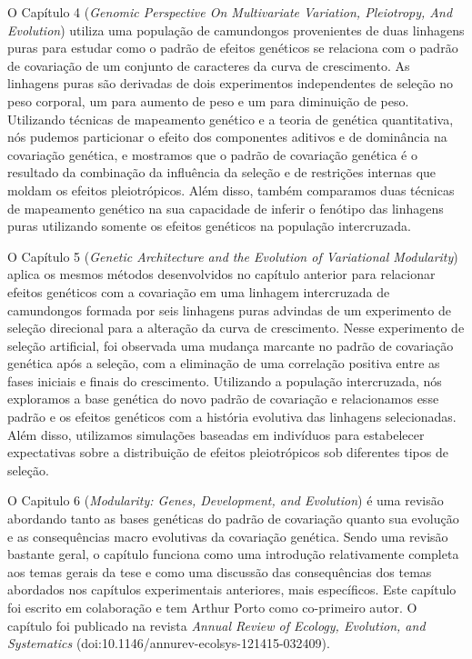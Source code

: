 \begin{refsection}
O Capítulo 4 (\textit{Genomic Perspective On Multivariate Variation,
Pleiotropy, And Evolution}) utiliza uma população de camundongos
provenientes de duas linhagens puras para estudar como o padrão de efeitos
genéticos se relaciona com o padrão de covariação de um conjunto de caracteres
da curva de crescimento. As linhagens puras são derivadas de dois experimentos
independentes de seleção no peso corporal, um para aumento de peso e um para
diminuição de peso. Utilizando técnicas de mapeamento genético e a teoria de
genética quantitativa, nós pudemos particionar o efeito dos
componentes aditivos e de dominância na covariação genética, e mostramos que o
padrão de covariação genética é o resultado da combinação da influência da
seleção e de restrições internas que moldam os efeitos pleiotrópicos. Além
disso, também comparamos duas técnicas de mapeamento genético na sua
capacidade de inferir o fenótipo das linhagens puras utilizando somente os
efeitos genéticos na população intercruzada. 

O Capítulo 5 (\textit{Genetic Architecture and the Evolution of Variational
Modularity}) aplica os mesmos métodos desenvolvidos no capítulo anterior para
relacionar efeitos genéticos com a covariação em uma linhagem intercruzada de
camundongos formada por seis linhagens puras advindas de um experimento de
seleção direcional para a alteração da curva de crescimento. Nesse experimento
de seleção artificial, foi observada uma mudança marcante no padrão de
covariação genética após a seleção, com a eliminação de uma correlação
positiva entre as fases iniciais e finais do crescimento. Utilizando a
população intercruzada, nós exploramos a base genética do novo padrão de
covariação e relacionamos esse padrão e os efeitos genéticos com a história
evolutiva das linhagens selecionadas. Além disso, utilizamos simulações
baseadas em indivíduos para estabelecer expectativas sobre a distribuição de
efeitos pleiotrópicos sob diferentes tipos de seleção.

O Capitulo 6 (\textit{Modularity: Genes, Development, and Evolution}) é uma
revisão abordando tanto as bases genéticas do padrão de covariação quanto sua
evolução e as consequências macro evolutivas da covariação genética. Sendo uma
revisão bastante geral, o capítulo funciona como uma introdução relativamente
completa aos temas gerais da tese e como uma discussão das consequências dos
temas abordados nos capítulos experimentais anteriores, mais específicos. Este
capítulo foi escrito em colaboração e tem Arthur Porto como co-primeiro autor.
O capítulo foi publicado na revista \textit{Annual Review of Ecology,
Evolution, and Systematics} (doi:10.1146/annurev-ecolsys-121415-032409).


\printbibliography


\end{refsection}